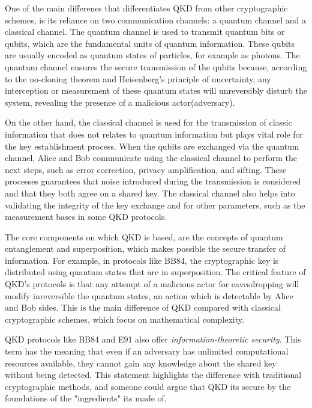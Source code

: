 \documentclass[12pt,a4paper] {report}
\begin{document}
		One of the main differenes that differentiates QKD from other cryptographic schemes, 
		is its reliance on two communication channels: 
		a quantum channel and a classical channel. 
		The quantum channel is used to transmit quantum bits or qubits, 
		which are the fundamental units of quantum information. 
		These qubits are usually encoded as quantum states of particles, for example as photons. 
		The quantum channel ensures the secure transmission of the qubits because, 
		according to the no-cloning theorem and 
		Heisenberg's principle of uncertainty, 
		any interception or measurement of these quantum states 
		will unreversibly disturb the system, revealing the presence of a malicious actor(adversary).

		On the other hand, the classical channel is used for the transmission of classic information 
		that does not relates to quantum information but plays vital role for the key establishment process.
		When the qubits are exchanged via the quantum channel, Alice and Bob communicate using the classical channel
		to perform the next steps, such as error correction, privacy amplification, and sifting. 
		These processes guarantees that noise introduced during the transmission is considered 
		and that they both agree on a shared key.
		The classical channel also helps into validating the integrity of the key exchange
		and for other parameters, such as the measurement bases in some QKD protocols.

		The core components on which QKD is based, are the concepts of quantum entanglement and superposition,
		which makes possible the secure transfer of information. 
		For example, in protocols like BB84, the cryptographic key is distributed using quantum states
		that are in superposition. The critical feature of QKD's protocols is that any attempt of a malicious actor for
		eavesdropping will modify inreversible the quantum states, an action which is detectable by Alice and Bob sides.
		This is the main difference of QKD compared with classical cryptographic schemes, which focus on mathematical complexity. 

		QKD protocols like BB84 and E91 also offer \textit{information-theoretic security}. This term has the meaning that even 
		if an adversary has unlimited computational resources available, they cannot gain any knowledge about the 
		shared key without being detected. This statement highlights the difference with traditional cryptographic methods, and 
		someone could argue that QKD its secure by the foundations of the "ingredients" its made of.
\end{document}
